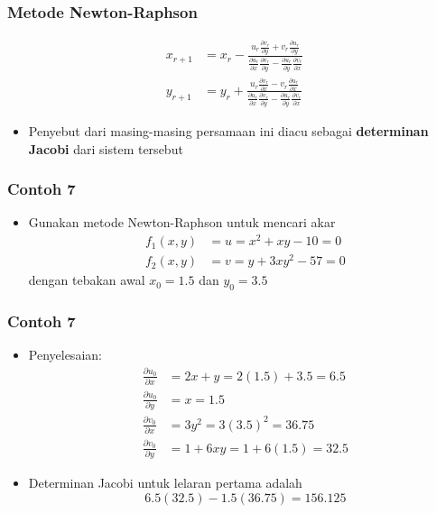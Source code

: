 \documentclass[pdflatex,compress]{beamer}
\begin{document}
\begin{frame}
	\frametitle{Metode Newton-Raphson}
	\begin{align*}
		x_{r+1} &= x_r - \frac{ u_r \frac{\partial v_r}{\partial y} + v_r \frac{\partial u_r}{\partial y} }{ \frac{\partial u_r}{\partial x}\frac{\partial v_r}{\partial y} - \frac{\partial u_r}{\partial y}\frac{\partial v_r}{\partial x} } \\
		y_{r+1} &= y_r + \frac{ u_r \frac{\partial v_r}{\partial x} - v_r \frac{\partial u_r}{\partial x} }{ \frac{\partial u_r}{\partial x}\frac{\partial v_r}{\partial y} - \frac{\partial u_r}{\partial y}\frac{\partial v_r}{\partial x} } 
	\end{align*}
	\begin{itemize}
		\item Penyebut dari masing-masing persamaan ini diacu
		sebagai \textbf{determinan Jacobi} dari sistem tersebut
	\end{itemize}
\end{frame}

\begin{frame}
	\frametitle{Contoh 7}
	\begin{itemize}
		\item Gunakan metode Newton-Raphson untuk mencari akar
		\begin{align*}
			f_1(x,y) &= u = x^2 + xy -10 = 0 \\
			f_2 (x,y) &= v = y + 3xy^2 - 57 = 0
		\end{align*}
		dengan tebakan awal $ x_0 =1.5 $ dan $ y_0 = 3.5 $
	\end{itemize}
\end{frame}

\begin{frame}
	\frametitle{Contoh 7}
	\begin{itemize}
		\item Penyelesaian:
		\begin{align*}
		\frac{\partial u_0}{\partial x} &= 2x + y = 2(1.5) + 3.5 = 6.5 \\
		\frac{\partial u_0}{\partial y} &= x = 1.5 \\
		\frac{\partial v_0}{\partial x} &= 3y^2 = 3(3.5)^2 = 36.75\\
		\frac{\partial v_0}{\partial y} &= 1 + 6xy = 1 + 6(1.5) = 32.5
		\end{align*}
		\item Determinan Jacobi untuk lelaran pertama adalah
		\[ 6.5(32.5) - 1.5(36.75) = 156.125 \]
	\end{itemize}
\end{frame}
\end{document}
